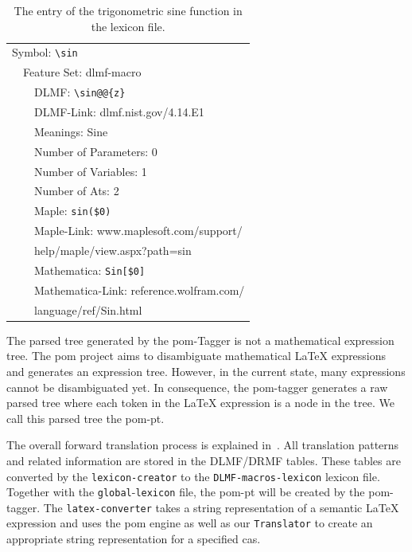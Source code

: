 \documentclass[a4paper,11pt]{article}
\theoremstyle{defTheoStyle}
\theoremstyle{defExampStyle}
\begin{document}
\begin{table}[ht!]
	\centering
	\begin{tabular}{lll}
	\hline
	\multicolumn{3}{l}{Symbol: \texttt{\textbackslash sin}} \\
	\! & \multicolumn{2}{l}{Feature Set: dlmf-macro} \\
	\! & \! & DLMF: \verb|\sin@@{z}|\\
	\! & \! & DLMF-Link: dlmf.nist.gov/4.14.E1\\
	\! & \! & Meanings: Sine\\
	\! & \! & Number of Parameters: 0\\
	\! & \! & Number of Variables: 1\\
	\! & \! & Number of Ats: 2\\
	\! & \! & Maple: \verb|sin($0)|\\
	\! & \! & Maple-Link: www.maplesoft.com/support/\\
	\! & \! & \hspace{32pt} help/maple/view.aspx?path=sin\\
	\! & \! & Mathematica: \verb|Sin[$0]|\\
	\! & \! & Mathematica-Link: reference.wolfram.com/\\
	\! & \! & \hspace{32pt} language/ref/Sin.html\\
	\hline
	\end{tabular}
	\caption{The entry of the trigonometric sine function in the lexicon file.}
	\label{tab:sine-lex-example}
\end{table}

The parsed tree generated by the \gls*{pom}-Tagger is not a mathematical expression tree. The \gls*{pom} project aims to disambiguate mathematical \LaTeX{} expressions and generates an expression tree. However, in the current state, many expressions cannot be disambiguated yet. In consequence, the \gls*{pom}-tagger generates a raw parsed tree where each token in the \LaTeX{} expression is a node in the tree. We call this parsed tree the \gls*{pom-pt}.

{\sloppy The overall forward translation process is explained in~. All translation patterns and related information are stored in the DLMF/DRMF tables. These tables are converted by the \verb|lexicon-creator| to the \verb|DLMF-macros-lexicon| lexicon file. Together with the \verb|global|-\verb|lexicon| file, the \gls*{pom-pt} will be created by the \gls*{pom}-tagger. The \verb|latex-converter| takes a string representation of a semantic \LaTeX{} expression and uses the \gls*{pom} engine as well as our \verb|Translator| to create an appropriate string representation for a specified \gls*{cas}.}
\end{document}
